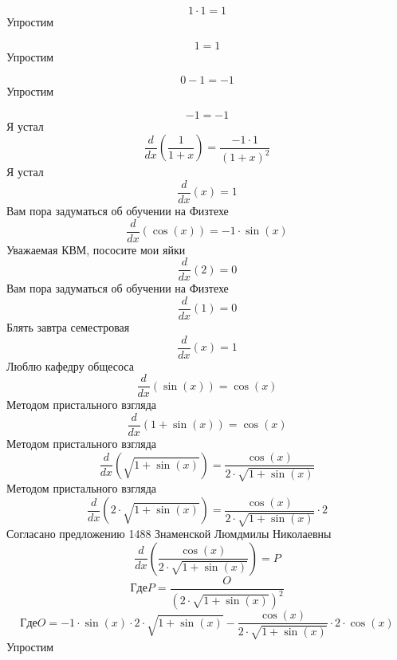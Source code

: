 \documentclass[12pt, a4paper]{article}
\begin{document}
\begin{equation}
1 \cdot 1 = 1
\end{equation}
Упростим

\begin{equation}
1 = 1
\end{equation}
Упростим

\begin{equation}
0-1 = -1
\end{equation}
Упростим

\begin{equation}
-1 = -1
\end{equation}
Я устал
\begin{equation}
\frac{d}{dx}(\frac{1}{1+x}) = \frac{-1 \cdot 1}{{(1+x)}^{2}}
\end{equation}
Я устал
\begin{equation}
\frac{d}{dx}(x) = 1
\end{equation}
Вам пора задуматься об обучении на Физтехе
\begin{equation}
\frac{d}{dx}(\cos(x)) = -1 \cdot \sin(x)
\end{equation}
Уважаемая КВМ, пососите мои яйки
\begin{equation}
\frac{d}{dx}(2) = 0
\end{equation}
Вам пора задуматься об обучении на Физтехе
\begin{equation}
\frac{d}{dx}(1) = 0
\end{equation}
Блять завтра семестровая
\begin{equation}
\frac{d}{dx}(x) = 1
\end{equation}
Люблю кафедру общесоса
\begin{equation}
\frac{d}{dx}(\sin(x)) = \cos(x)
\end{equation}
Методом пристального взгляда
\begin{equation}
\frac{d}{dx}(1+\sin(x)) = \cos(x)
\end{equation}
Методом пристального взгляда
\begin{equation}
\frac{d}{dx}(\sqrt{1+\sin(x)}) = \frac{\cos(x)}{2 \cdot \sqrt{1+\sin(x)}}
\end{equation}
Методом пристального взгляда
\begin{equation}
\frac{d}{dx}(2 \cdot \sqrt{1+\sin(x)}) = \frac{\cos(x)}{2 \cdot \sqrt{1+\sin(x)}} \cdot 2
\end{equation}
Согласано предложению 1488 Знаменской Люмдмилы Николаевны
\begin{equation}
\frac{d}{dx}(\frac{\cos(x)}{2 \cdot \sqrt{1+\sin(x)}}) = P
\end{equation}
$$Где P = \frac{O}{{(2 \cdot \sqrt{1+\sin(x)})}^{2}}$$
$$Где O = -1 \cdot \sin(x) \cdot 2 \cdot \sqrt{1+\sin(x)}-\frac{\cos(x)}{2 \cdot \sqrt{1+\sin(x)}} \cdot 2 \cdot \cos(x)$$
Упростим
\end{document}
